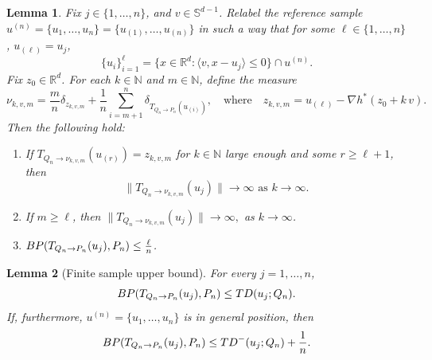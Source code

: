 \documentclass[10pt,a4paper]{amsart}
\newtheorem{lemma}{Lemma}
\newcommand{\NN}{\mathbb{N}}
\newcommand{\R}{\RR}
\newcommand{\RR}{\mathbb{R}}
\begin{document}
\begin{lemma}\label{lemma:discrete-upper}
    Fix $j\in \{1, \dots, n\}$, and $v\in \mathbb{S}^{d-1}$.  
%
Relabel  the reference sample $u^{(n)}=\{u_1, \dots, u_{n}\}= \{ u_{(1)}, \dots, u_{(n)}\}$ in such a way that for some $\ell\in \{1, \dots, n\}$,  $u_{(\ell)}= u_j$, 
$$ \{u_i\}_{i=1}^{\ell}= \{ x\in \mathbb{R}^d: \langle v, x-u_j\rangle \leq  0\} \cap u^{(n)}. $$
Fix $z_0\in \R^d$. For each $k\in \NN$ and $m\in \NN$, 
    define the measure 
    \begin{equation}\label{eq:def-nu-zeta}
        \nu_{k,v,m}=\frac{m}{n} \delta_{ z_{k,v,m}} + \frac{1}{n} \sum_{i=m+1}^n \delta_{T_{Q_n\to P_n}(u_{(i)})} , \quad \text{where}\quad z_{k,v,m} = u_{(\ell)} - \nabla h^{*}(z_0+k\, v). 
    \end{equation} Then the following hold: 

\begin{enumerate}
    \item  If   $ T_{Q_n\to \nu_{k,v,m}}(u_{(r)})=z_{k,v,m} $ for $k\in \NN$ large enough and some $r\geq \ell+1$, then
    $$ \text{$\| T_{Q_n\to \nu_{k,v,m}}(u_{j} )\|\to \infty  $ as $k\to \infty$.}$$
     
    \item If $m\geq \ell$, then $\| T_{Q_n\to \nu_{k,v,m}}(u_{j} )\|\to \infty  ,$ as $k\to \infty$. 
    \item ${\rm BP}({ T}_{Q_n\to P_n}(u_j), P_n) \leq  \frac{\ell}{n}$.
\end{enumerate}



\end{lemma}

\begin{lemma}[Finite sample upper bound]\label{lem:finite_sample_UB}
For every $j=1, \dots, n$, 
\begin{equation}
    \label{eq:discrete-BP-proof}
     {\rm BP}({ T}_{Q_n\to P_n}(u_j), P_n) \leq  {\rm TD}(u_j;Q_n) .
\end{equation}
If, furthermore, $u^{(n)}=\{u_1, \dots, u_n\}$ is in general position, then 
\begin{equation}
    \label{eq:General-Position-proof}
    {\rm BP}({ T}_{Q_n\to P_n}(u_j), P_n) \leq  
{\rm TD}^{-}(u_j;Q_n)+\frac{1}{n}.
\end{equation}
\end{lemma}
\end{document}
